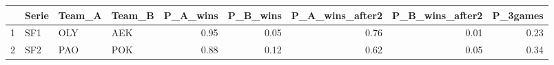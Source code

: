 \begin{table}[ht]
\centering
\begin{tabular}{rlllrrrrr}
  \hline
 & Serie & Team\_A & Team\_B & P\_A\_wins & P\_B\_wins & P\_A\_wins\_after2 & P\_B\_wins\_after2 & P\_3games \\ 
  \hline
1 & SF1 & OLY & AEK & 0.95 & 0.05 & 0.76 & 0.01 & 0.23 \\ 
  2 & SF2 & PAO & POK & 0.88 & 0.12 & 0.62 & 0.05 & 0.34 \\ 
   \hline
\end{tabular}
\end{table}
